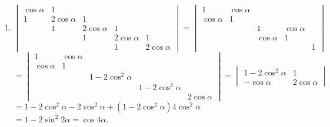 \begin{enumerate}
			\item %
			      $\begin{vmatrix}
					      \cos\alpha & 1           &             &             &             \\
					      1          & 2\cos\alpha & 1           &             &             \\
					                 & 1           & 2\cos\alpha & 1           &             \\
					                 &             & 1           & 2\cos\alpha & 1           \\
					                 &             &             & 1           & 2\cos\alpha
				      \end{vmatrix} = \begin{vmatrix}
					      1          & \cos\alpha &            &            &   \\
					      \cos\alpha & 1          &            &            &   \\
					                 &            & 1          & \cos\alpha &   \\
					                 &            & \cos\alpha & 1          &   \\
					                 &            &            &            & 1
				      \end{vmatrix}$
			      $= \begin{vmatrix}
					      1          & \cos\alpha &                 &                 &             \\
					      \cos\alpha & 1          &                 &                 &             \\
					                 &            & 1-2\cos^2\alpha &                 &             \\
					                 &            &                 & 1-2\cos^2\alpha &             \\
					                 &            &                 &                 & 2\cos\alpha
				      \end{vmatrix} = \begin{vmatrix}
					      1-2\cos^2\alpha & 1           \\
					      -\cos\alpha     & 2\cos\alpha
				      \end{vmatrix}$
			      $= 1-2\cos^2\alpha - 2\cos^2\alpha + (1-2\cos^2\alpha)4\cos^2\alpha$
			      $= 1-2\sin^2 2\alpha = \cos 4\alpha$.


\end{enumerate}
